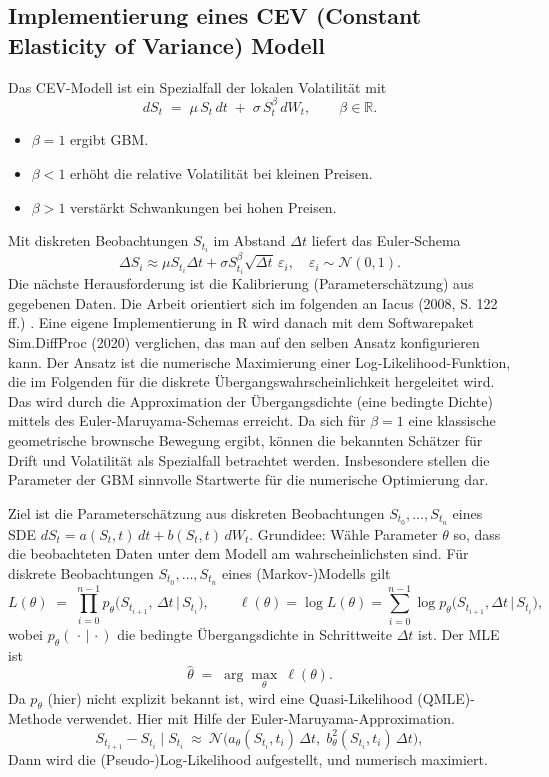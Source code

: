 \subsection{Implementierung eines CEV (Constant Elasticity of Variance) Modell}
Das CEV-Modell ist ein Spezialfall der lokalen Volatilität mit
$$
dS_t \;=\; \mu\,S_t\,dt \;+\; \sigma\,S_t^{\beta}\,dW_t,\qquad \beta\in\mathbb R.
$$
\begin{itemize}
\item $\beta=1$ ergibt GBM. 
\item $\beta<1$ erhöht die relative Volatilität bei kleinen Preisen.
\item $\beta>1$ verstärkt Schwankungen bei hohen Preisen.
\end{itemize}
Mit diskreten Beobachtungen $S_{t_i}$ im Abstand $\Delta t$ liefert das Euler‑Schema
$$
\Delta S_i \approx \mu S_{t_i}\Delta t + \sigma S_{t_i}^{\beta}\sqrt{\Delta t}\,\varepsilon_i,\quad \varepsilon_i\sim\mathcal N(0,1).
$$
Die nächste Herausforderung ist die Kalibrierung (Parameterschätzung) aus gegebenen Daten. Die Arbeit 
orientiert sich im folgenden an Iacus (2008, S. 122 ff.) \cite{iacus2008}. Eine eigene Implementierung in
R wird danach mit dem Softwarepaket Sim.DiffProc \cite{rsde} (2020) verglichen, das man auf den selben Ansatz konfigurieren kann.
Der Ansatz ist die numerische Maximierung einer Log-Likelihood-Funktion, die im Folgenden 
für die diskrete Übergangswahrscheinlichkeit hergeleitet wird.
Das wird durch die Approximation der Übergangsdichte (eine bedingte Dichte) mittels des 
Euler-Maruyama-Schemas erreicht. Da sich für $\beta=1$ eine klassische geometrische brownsche Bewegung ergibt, 
können die bekannten Schätzer für Drift und Volatilität als Spezialfall betrachtet werden. Insbesondere stellen die Parameter der GBM 
sinnvolle Startwerte für die numerische Optimierung dar.

\begin{lemma}
Ziel ist die Parameterschätzung aus diskreten Beobachtungen $S_{t_0},\dots,S_{t_n}$ eines SDE
$dS_t=a(S_t,t)\,dt+b(S_t,t)\,dW_t$. Grundidee: Wähle Parameter $\theta$ so, dass die beobachteten 
Daten unter dem Modell am wahrscheinlichsten sind. Für diskrete Beobachtungen $S_{t_0},\dots,S_{t_n}$ eines (Markov‑)Modells gilt
$$
L(\theta) \;=\; \prod_{i=0}^{n-1} p_\theta\!\big(S_{t_{i+1}},\,\Delta t \,\big|\, S_{t_i}\big), 
\qquad
\ell(\theta)=\log L(\theta)=\sum_{i=0}^{n-1}\log p_\theta\!\big(S_{t_{i+1}},\Delta t \,\big|\, S_{t_i}\big),
$$
wobei $p_\theta(\,\cdot\,|\,\cdot)$ die bedingte Übergangsdichte in Schrittweite $\Delta t$ ist. Der MLE ist
$$
\widehat\theta\;=\;\arg\max_{\theta}\ \ell(\theta).
$$
Da $p_\theta$ (hier) nicht explizit bekannt ist, wird eine Quasi-Likelihood (QMLE)-Methode verwendet. 
Hier mit Hilfe der Euler-Maruyama-Approximation.
$$
S_{t_{i+1}}-S_{t_i}\mid S_{t_i}\ \approx\ \mathcal N\!\big(a_\theta(S_{t_i},t_i)\,\Delta t,\; b_\theta^2(S_{t_i},t_i)\,\Delta t\big),
$$
Dann wird die (Pseudo‑)Log‑Likelihood aufgestellt, und numerisch maximiert.
\end{lemma}

